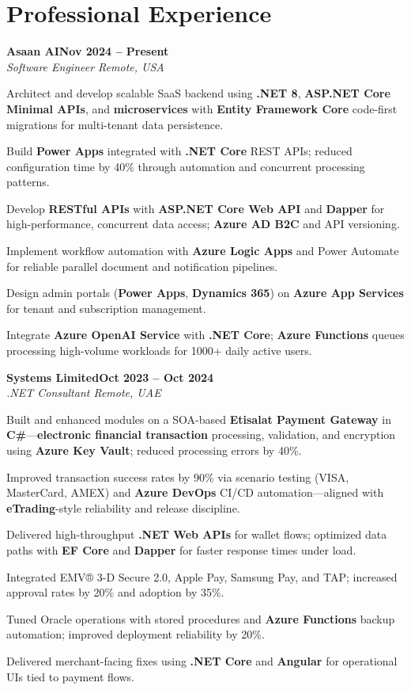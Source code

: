 \documentclass[letterpaper,10pt]{article}
\newcommand{\headingBf}[2]{
  \hspace{10pt}\textbf{#1}\hfill\textbf{#2}\\
}
\newcommand{\headingIt}[2]{
  \hspace{10pt}\textit{#1}\hfill\textit{#2}\\
}
\newenvironment{resume_list}{
  \vspace{-7pt}
  \begin{itemize}[itemsep=-2px, parsep=1pt, leftmargin=30pt]
}{
  \end{itemize}
}
\begin{document}
\section{Professional Experience}

\headingBf{Asaan AI}{Nov 2024 -- Present}
\headingIt{Software Engineer \hfill Remote, USA}{}
\begin{resume_list}
    \item Architect and develop scalable SaaS backend using \textbf{.NET 8}, \textbf{ASP.NET Core Minimal APIs}, and \textbf{microservices} with \textbf{Entity Framework Core} code-first migrations for multi-tenant data persistence.
    \item Build \textbf{Power Apps} integrated with \textbf{.NET Core} REST APIs; reduced configuration time by 40\% through automation and concurrent processing patterns.
    \item Develop \textbf{RESTful APIs} with \textbf{ASP.NET Core Web API} and \textbf{Dapper} for high-performance, concurrent data access; \textbf{Azure AD B2C} and API versioning.
    \item Implement workflow automation with \textbf{Azure Logic Apps} and Power Automate for reliable parallel document and notification pipelines.
    \item Design admin portals (\textbf{Power Apps}, \textbf{Dynamics 365}) on \textbf{Azure App Services} for tenant and subscription management.
    \item Integrate \textbf{Azure OpenAI Service} with \textbf{.NET Core}; \textbf{Azure Functions} queues processing high-volume workloads for 1000+ daily active users.
\end{resume_list}

\headingBf{Systems Limited}{Oct 2023 -- Oct 2024}
\headingIt{.NET Consultant \hfill Remote, UAE}{}
\begin{resume_list}
    \item Built and enhanced modules on a SOA-based \textbf{Etisalat Payment Gateway} in \textbf{C\#}---\textbf{electronic financial transaction} processing, validation, and encryption using \textbf{Azure Key Vault}; reduced processing errors by 40\%.
    \item Improved transaction success rates by 90\% via scenario testing (VISA, MasterCard, AMEX) and \textbf{Azure DevOps} CI/CD automation---aligned with \textbf{eTrading}-style reliability and release discipline.
    \item Delivered high-throughput \textbf{.NET Web APIs} for wallet flows; optimized data paths with \textbf{EF Core} and \textbf{Dapper} for faster response times under load.
    \item Integrated EMV® 3-D Secure 2.0, Apple Pay, Samsung Pay, and TAP; increased approval rates by 20\% and adoption by 35\%.
    \item Tuned Oracle operations with stored procedures and \textbf{Azure Functions} backup automation; improved deployment reliability by 20\%.
    \item Delivered merchant-facing fixes using \textbf{.NET Core} and \textbf{Angular} for operational UIs tied to payment flows.
\end{resume_list}
\end{document}

